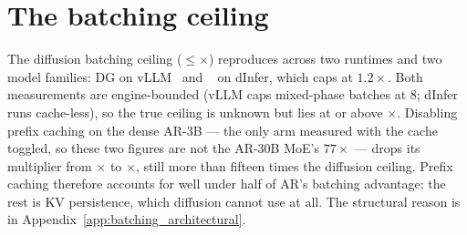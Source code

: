 \section{The batching ceiling}
\label{app:batching} The diffusion batching ceiling ($\leq$\dgBatchVllmHi$\times$) reproduces across
two runtimes and two model families: DG on vLLM~\cite{vllm2023} and
\LLaDA~\cite{llada2025} on dInfer, which caps at $1.2\times$. Both
measurements are engine-bounded
(vLLM caps mixed-phase batches at 8; dInfer runs cache-less), so the
true ceiling is unknown but lies at or above \dgBatchVllmHi$\times$.
Disabling prefix caching on the dense AR-3B --- the only arm measured
with the cache toggled, so these two figures are not the AR-30B MoE's
$77\times$ --- drops its multiplier from \cacheOnMult$\times$ to
\cacheOffMult$\times$, still more than fifteen times the diffusion
ceiling. Prefix caching therefore accounts for well under half of AR's
batching advantage; the rest is KV persistence, which diffusion cannot
use at all. The structural reason is in
Appendix~\ref{app:batching_architectural}.
